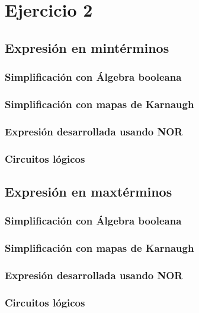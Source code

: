\section{Ejercicio 2}

\subsection{Expresi\'on en mint\'erminos}

\subsubsection{Simplificación con Álgebra booleana}

\subsubsection{Simplificación con mapas de Karnaugh}

\subsubsection{Expresión desarrollada usando NOR}

\subsubsection{Circuitos lógicos}

\subsection{Expresi\'on en maxt\'erminos}

\subsubsection{Simplificación con Álgebra booleana}

\subsubsection{Simplificación con mapas de Karnaugh}

\subsubsection{Expresión desarrollada usando NOR}

\subsubsection{Circuitos lógicos}
